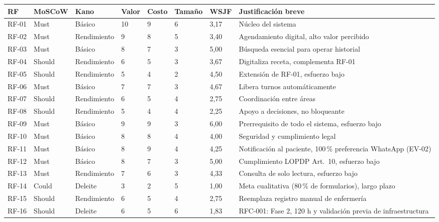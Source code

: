 \documentclass[11pt,a4paper]{article}
\begin{document}
	\begin{longtable}{p{} p{} p{} p{} p{} p{} p{} p{}}
		
		\toprule
		\textbf{RF} & \textbf{MoSCoW} & \textbf{Kano} & \textbf{Valor} & \textbf{Costo} & \textbf{Tamaño} & \textbf{WSJF} & \textbf{Justificación breve} \\
		\midrule
		\endhead
		
		
		RF-01 & Must    & Básico      & 10 & 9 & 6 & 3,17 & Núcleo del sistema \\
		RF-02 & Must    & Rendimiento & 9  & 8 & 5 & 3,40 & Agendamiento digital, alto valor percibido \\
		RF-03 & Must    & Básico      & 8  & 7 & 3 & 5,00 & Búsqueda esencial para operar historial \\
		RF-04 & Should  & Rendimiento & 6  & 5 & 3 & 3,67 & Digitaliza receta, complementa RF-01 \\
		RF-05 & Should  & Rendimiento & 5  & 4 & 2 & 4,50 & Extensión de RF-01, esfuerzo bajo \\
		RF-06 & Must    & Básico      & 7  & 7 & 3 & 4,67 & Libera turnos automáticamente \\
		RF-07 & Should  & Rendimiento & 6  & 5 & 4 & 2,75 & Coordinación entre áreas \\
		RF-08 & Should  & Rendimiento & 5  & 4 & 4 & 2,25 & Apoyo a decisiones, no bloqueante \\
		RF-09 & Must    & Básico      & 9  & 9 & 3 & 6,00 & Prerrequisito de todo el sistema, esfuerzo bajo \\
		RF-10 & Must    & Básico      & 8  & 8 & 4 & 4,00 & Seguridad y cumplimiento legal \\
		RF-11 & Must    & Básico      & 8  & 9 & 4 & 4,25 & Notificación al paciente, 100\,\% preferencia WhatsApp (EV-02) \\
		RF-12 & Must    & Básico      & 8  & 7 & 3 & 5,00 & Cumplimiento LOPDP Art.\ 10, esfuerzo bajo \\
		RF-13 & Must    & Rendimiento & 7  & 6 & 3 & 4,33 & Consulta de solo lectura, esfuerzo bajo \\
		RF-14 & Could   & Deleite     & 3  & 2 & 5 & 1,00 & Meta cualitativa (80\,\% de formularios), largo plazo \\
		RF-15 & Should  & Rendimiento & 6  & 5 & 4 & 2,75 & Reemplaza registro manual de enfermería \\
		RF-16 & Should  & Deleite     & 6  & 5 & 6 & 1,83 & RFC-001: Fase 2, 120 h y validación previa de infraestructura \\

\end{longtable}
\end{document}
